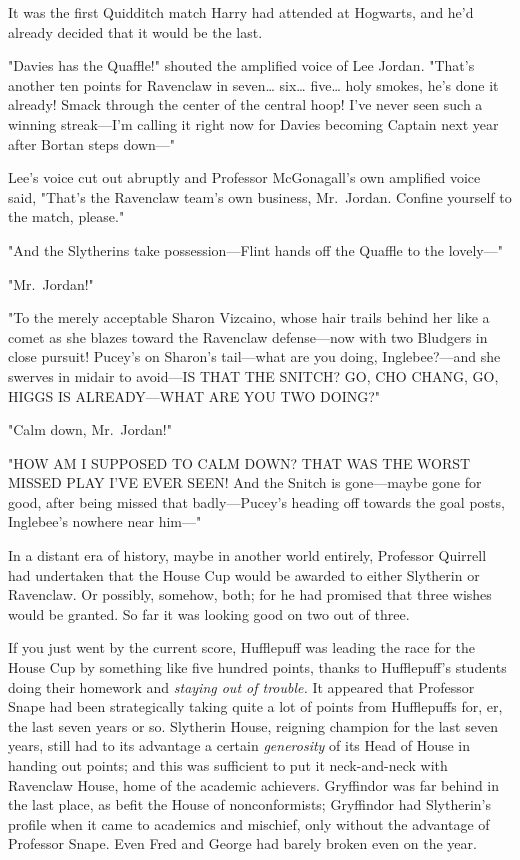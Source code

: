 It was the first Quidditch match Harry had attended at Hogwarts, and he'd 
already decided that it would be the last.

"Davies has the Quaffle!" shouted the amplified voice of Lee Jordan. "That's 
another ten points for Ravenclaw in seven{\ldots} six{\ldots} five{\ldots} holy 
smokes, he's done it already! Smack through the center of the central hoop! 
I've never seen such a winning streak---I'm calling it right now for Davies 
becoming Captain next year after Bortan steps down---"

Lee's voice cut out abruptly and Professor McGonagall's own amplified voice 
said, "That's the Ravenclaw team's own business, Mr.~Jordan. Confine yourself 
to the match, please."

"And the Slytherins take possession---Flint hands off the Quaffle to the 
lovely---"

"Mr.~Jordan!"

"To the merely acceptable Sharon Vizcaino, whose hair trails behind her like a 
comet as she blazes toward the Ravenclaw defense---now with two Bludgers in 
close pursuit! Pucey's on Sharon's tail---what are you doing, Inglebee?---and 
she swerves in midair to avoid---IS THAT THE SNITCH? GO, CHO CHANG, GO, HIGGS 
IS ALREADY---WHAT ARE YOU TWO DOING?"

"Calm down, Mr.~Jordan!"

"HOW AM I SUPPOSED TO CALM DOWN? THAT WAS THE WORST MISSED PLAY I'VE EVER SEEN! 
And the Snitch is gone---maybe gone for good, after being missed that 
badly---Pucey's heading off towards the goal posts, Inglebee's nowhere near 
him---"

In a distant era of history, maybe in another world entirely, Professor 
Quirrell had undertaken that the House Cup would be awarded to either Slytherin 
or Ravenclaw. Or possibly, somehow, both; for he had promised that three wishes 
would be granted. So far it was looking good on two out of three.

If you just went by the current score, Hufflepuff was leading the race for the 
House Cup by something like five hundred points, thanks to Hufflepuff's 
students doing their homework and \emph{staying out of trouble.} It appeared 
that Professor Snape had been strategically taking quite a lot of points from 
Hufflepuffs for, er, the last seven years or so. Slytherin House, reigning 
champion for the last seven years, still had to its advantage a certain 
\emph{generosity} of its Head of House in handing out points; and this was 
sufficient to put it neck-and-neck with Ravenclaw House, home of the academic 
achievers. Gryffindor was far behind in the last place, as befit the House of 
nonconformists; Gryffindor had Slytherin's profile when it came to academics 
and mischief, only without the advantage of Professor Snape. Even Fred and 
George had barely broken even on the year.

